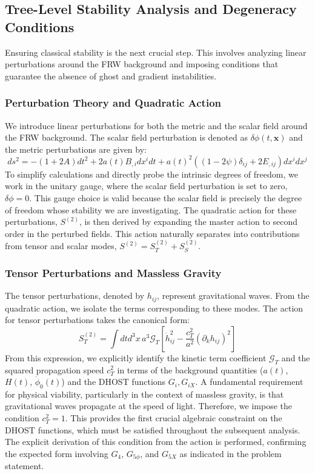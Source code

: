 \documentclass[twocolumn]{aastex631}
\begin{document}
\subsection{Tree-Level Stability Analysis and Degeneracy Conditions}
Ensuring classical stability is the next crucial step. This involves analyzing linear perturbations around the FRW background and imposing conditions that guarantee the absence of ghost and gradient instabilities.

\subsubsection{Perturbation Theory and Quadratic Action}
We introduce linear perturbations for both the metric and the scalar field around the FRW background. The scalar field perturbation is denoted as $\delta\phi(t, \mathbf{x})$ and the metric perturbations are given by:
$$ ds^2 = -(1+2A)dt^2 + 2a(t)B_{,i} dx^i dt + a(t)^2 ((1-2\psi)\delta_{ij} + 2E_{,ij}) dx^i dx^j $$
To simplify calculations and directly probe the intrinsic degrees of freedom, we work in the unitary gauge, where the scalar field perturbation is set to zero, $\delta\phi = 0$. This gauge choice is valid because the scalar field is precisely the degree of freedom whose stability we are investigating.
The quadratic action for these perturbations, $S^{(2)}$, is then derived by expanding the master action to second order in the perturbed fields. This action naturally separates into contributions from tensor and scalar modes, $S^{(2)} = S_T^{(2)} + S_S^{(2)}$.

\subsubsection{Tensor Perturbations and Massless Gravity}
The tensor perturbations, denoted by $h_{ij}$, represent gravitational waves. From the quadratic action, we isolate the terms corresponding to these modes. The action for tensor perturbations takes the canonical form:
$$ S_T^{(2)} = \int dt d^3x \, a^3 \mathcal{G}_T \left[ \dot{h}_{ij}^2 - \frac{c_T^2}{a^2} (\partial_k h_{ij})^2 \right] $$
From this expression, we explicitly identify the kinetic term coefficient $\mathcal{G}_T$ and the squared propagation speed $c_T^2$ in terms of the background quantities ($a(t)$, $H(t)$, $\dot{\phi}_0(t)$) and the DHOST functions $G_i, G_{iX}$. A fundamental requirement for physical viability, particularly in the context of massless gravity, is that gravitational waves propagate at the speed of light. Therefore, we impose the condition $c_T^2 = 1$. This provides the first crucial algebraic constraint on the DHOST functions, which must be satisfied throughout the subsequent analysis. The explicit derivation of this condition from the action is performed, confirming the expected form involving $G_4$, $G_{5\phi}$, and $G_{5X}$ as indicated in the problem statement.
\end{document}
